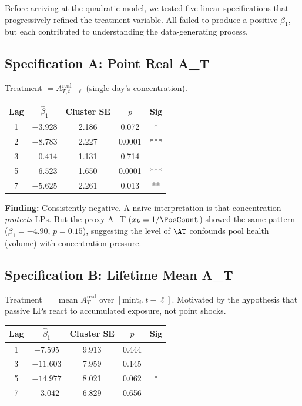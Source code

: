 Before arriving at the quadratic model, we tested five linear specifications
that progressively refined the treatment variable. All failed to produce a
positive $\beta_1$, but each contributed to understanding the data-generating
process.

\subsection{Specification A: Point Real A\_T}

Treatment $= A_{T,t-\ell}^{\text{real}}$ (single day's concentration).

\begin{center}
\begin{tabular}{@{}ccccc@{}}
\toprule
Lag & $\hat{\beta}_1$ & Cluster SE & $p$ & Sig \\
\midrule
1 & $-3.928$ & 2.186 & 0.072 & * \\
2 & $-8.783$ & 2.227 & 0.0001 & *** \\
3 & $-0.414$ & 1.131 & 0.714 & \\
5 & $-6.523$ & 1.650 & 0.0001 & *** \\
7 & $-5.625$ & 2.261 & 0.013 & ** \\
\bottomrule
\end{tabular}
\end{center}

\textbf{Finding:} Consistently negative. A naive interpretation is that
concentration \emph{protects} LPs. But the proxy A\_T ($x_k = 1/\PosCount$)
showed the same pattern ($\beta_1 = -4.90$, $p = 0.15$), suggesting the level
of $\AT$ confounds pool health (volume) with concentration pressure.

\subsection{Specification B: Lifetime Mean A\_T}

Treatment $=$ mean $A_T^{\text{real}}$ over $[\text{mint}_i, t - \ell]$.
Motivated by the hypothesis that passive LPs react to accumulated exposure,
not point shocks.

\begin{center}
\begin{tabular}{@{}ccccc@{}}
\toprule
Lag & $\hat{\beta}_1$ & Cluster SE & $p$ & Sig \\
\midrule
1 & $-7.595$ & 9.913 & 0.444 & \\
3 & $-11.603$ & 7.959 & 0.145 & \\
5 & $-14.977$ & 8.021 & 0.062 & * \\
7 & $-3.042$ & 6.829 & 0.656 & \\
\bottomrule
\end{tabular}
\end{center}

